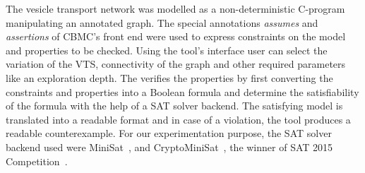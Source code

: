 %
%	
The vesicle transport network was modelled as a non-deterministic C-program manipulating an annotated graph. 
%
The special annotations \textit{assumes} and \textit{assertions} of CBMC's front end were used to express constraints on the model and properties to be checked. 
%
%		
Using the tool's interface user can select the variation of the VTS, connectivity of the graph and other required parameters like an exploration depth.
%
The {\sattool} verifies the properties by first converting the constraints and properties into a Boolean formula and determine the satisfiability of the formula with the help of a SAT solver backend.
%
The satisfying model is translated into a readable format and in case of a violation, the tool produces a readable counterexample.
For our experimentation purpose, the SAT solver backend used were MiniSat~\cite{sorensson2005minisat}, and CryptoMiniSat~\cite{soos2016cryptominisat}, the winner of SAT 2015 Competition~\cite{balyo2016sat}. 


